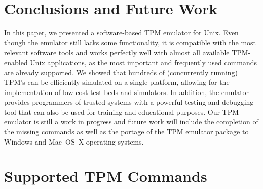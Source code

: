 \documentclass[runningheads]{llncs}
\begin{document}

\section{Conclusions and Future Work}
In this paper, we presented a software-based TPM emulator for Unix. Even
though the emulator still lacks some functionality, it is compatible with
the most relevant software tools and works perfectly well with almost all
available TPM-enabled Unix applications, as the most important and frequently
used commands are already supported. We showed that hundreds of (concurrently
running) TPM's can be efficiently simulated on a single platform, allowing for
the implementation of low-cost test-beds and simulators. In addition, the
emulator provides programmers of trusted systems with a powerful testing and
debugging tool that can also be used for training and educational purposes.
Our TPM emulator is still a work in progress and future work will include the
completion of the missing commands as well as the portage of the TPM emulator
package to Windows and Mac~OS~X operating systems.




\appendix

\section{Supported TPM Commands}\label{app:commands}
\newcommand{\tpmred}{tpmgray!10!red!50!white}
\newcommand{\tpmyellow}{tpmgray!10!yellow!50!white}
\newcommand{\tpmgreen}{tpmgray!10!green!50!white}
\newcommand{\tpmcolor}{tpmgray}
\end{document}
